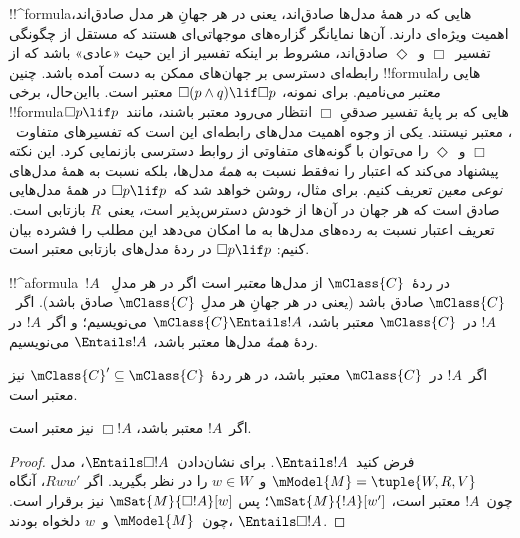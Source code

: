 \documentclass[../../../include/open-logic-section]{subfiles}
\begin{document}


\begin{explain}
  !!^{formula}هایی که در همهٔ مدل‌ها صادق‌اند، یعنی در هر جهانِ هر مدل
  صادق‌اند، اهمیت ویژه‌ای دارند. آن‌ها نمایانگر گزاره‌های موجهاتی‌ای
  هستند که مستقل از چگونگی تفسیر~$\Box$ و~$\Diamond$ صادق‌اند، مشروط
  بر اینکه تفسیر از این حیث «عادی» باشد که از رابطه‌ای دسترسی بر
  جهان‌های ممکن به دست آمده باشد. چنین !!{formula}هایی را
  \emph{معتبر} می‌نامیم. برای نمونه، $\Box(p \land q) \lif \Box p$
  معتبر است. بااین‌حال، برخی !!{formula}هایی که بر پایهٔ تفسیر صدقیِ
  $\Box$ انتظار می‌رود معتبر باشند، مانند~$\Box p \lif p$، معتبر
  نیستند. یکی از وجوه اهمیت مدل‌های رابطه‌ای این است که تفسیرهای
  متفاوت~$\Box$ و~$\Diamond$ را می‌توان با گونه‌های متفاوتی از روابط
  دسترسی بازنمایی کرد. این نکته پیشنهاد می‌کند که اعتبار را نه‌فقط
  نسبت به \emph{همهٔ} مدل‌ها، بلکه نسبت به همهٔ مدل‌های \emph{نوعی
  معین} تعریف کنیم. برای مثال، روشن خواهد شد که~$\Box p \lif p$ در
  همهٔ مدل‌هایی صادق است که هر جهان در آن‌ها از خودش دسترس‌پذیر است،
  یعنی~$R$ بازتابی است. تعریف اعتبار نسبت به رده‌های مدل‌ها به ما امکان
  می‌دهد این مطلب را فشرده بیان کنیم: $\Box p \lif p$ در ردهٔ مدل‌های
  بازتابی معتبر است.
\end{explain}

\begin{defn}
  !!^a{formula}~$!A$ در ردهٔ~$\mClass{C}$ از مدل‌ها \emph{معتبر} است
  اگر در هر مدلِ~$\mClass{C}$ صادق باشد (یعنی در هر جهانِ هر مدلِ
  $\mClass{C}$ صادق باشد). اگر~$!A$ در~$\mClass{C}$ معتبر باشد،
  $\mClass{C} \Entails !A$ می‌نویسیم؛ و اگر~$!A$ در ردهٔ
  \emph{همهٔ} مدل‌ها معتبر باشد، $\Entails !A$ می‌نویسیم.
\end{defn}

\begin{prop}
  اگر~$!A$ در~$\mClass{C}$ معتبر باشد، در هر ردهٔ
  $\mClass{C}' \subseteq \mClass{C}$ نیز معتبر است.
\end{prop}

\begin{prop}
  اگر~$!A$ معتبر باشد، $\Box!A$ نیز معتبر است.
\end{prop}

\begin{proof}
  فرض کنید~$\Entails !A$. برای نشان‌دادن~$\Entails \Box!A$، مدل
  $\mModel{M} = \tuple{W, R, V}$ و~$w \in W$ را در نظر بگیرید. اگر
  $Rww'$، آنگاه چون~$!A$ معتبر است، $\mSat{M}{!A}[w']$؛ پس
  $\mSat{M}{\Box!A}[w]$ نیز برقرار است. چون~$\mModel{M}$ و~$w$
  دلخواه بودند، $\Entails \Box!A$.
\end{proof}
\end{document}

